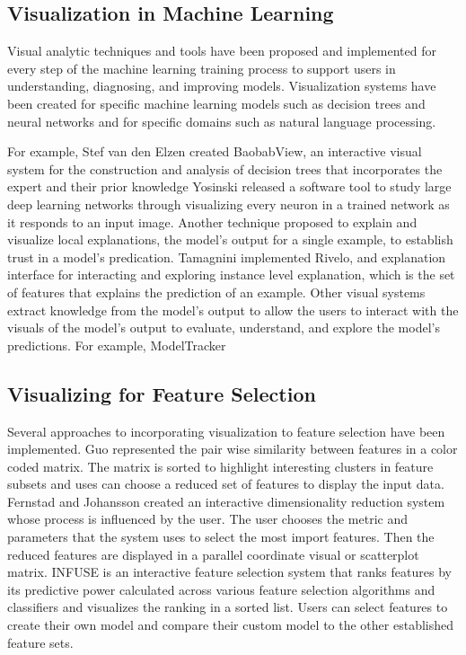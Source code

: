 \subsection{Visualization in Machine Learning}
\indent Visual analytic techniques and tools have been proposed and implemented for every step of the machine learning training process to support users in understanding, diagnosing, and improving models. Visualization systems have been created for specific machine learning models such as decision trees and neural networks and for specific domains such as natural language processing. 

\indent For example, Stef van den Elzen created BaobabView, an interactive visual system for the construction and analysis of decision trees that incorporates the expert and their prior knowledge 
Yosinski released a software tool to study large deep learning networks through visualizing every neuron in a trained network as it responds to an input image. Another technique proposed to explain and visualize local explanations, the model’s output for a single example, to establish trust in a model’s predication. Tamagnini implemented Rivelo, and explanation interface for interacting and exploring instance level explanation, which is the set of features that explains the prediction of an example. 
Other visual systems extract knowledge from the model’s output to allow the users to interact with the visuals of the model’s output to evaluate, understand, and explore the model’s predictions. For example, ModelTracker 

\subsection{Visualizing for Feature Selection}
\indent Several approaches to incorporating visualization to feature selection have been implemented. Guo represented the pair wise similarity between features in a color coded matrix. The matrix is sorted to highlight interesting clusters in feature subsets and uses can choose a reduced set of features to display the input data. Fernstad and Johansson created an interactive dimensionality reduction system whose process is influenced by the user. The user chooses the metric and parameters that the system uses to select the most import features. Then the reduced features are displayed in a parallel coordinate visual or scatterplot matrix. INFUSE is an interactive feature selection system that ranks features by its predictive power calculated across various feature selection algorithms and classifiers and visualizes the ranking in a sorted list. Users can select features to create their own model and compare their custom model to the other established feature sets. 
